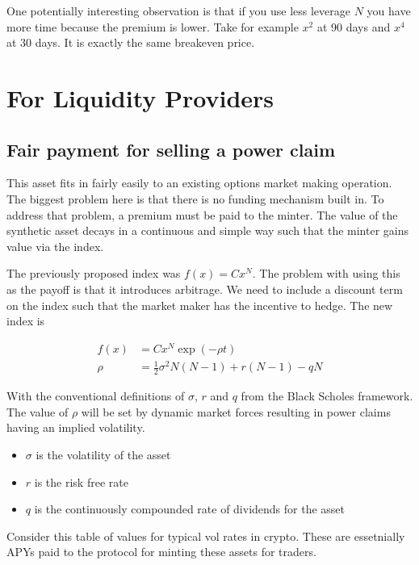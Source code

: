 \documentclass[12pt]{article}
\newcommand{\half}{\tfrac{1}{2}}
\begin{document}
    One potentially interesting observation is that if you use less leverage $N$ you have more time because the premium is lower. Take for example $x^2$ at 90 days and $x^4$ at 30 days. It is exactly the same breakeven price.

    \section{For Liquidity Providers}

    \subsection{Fair payment for selling a power claim}

    This asset fits in fairly easily to an existing options market making operation. The biggest problem here is that there is no funding mechanism built in. To address that problem, a premium must be paid to the minter. The value of the synthetic asset decays in a continuous and simple way such that the minter gains value via the index.

    The previously proposed index was $f(x) = C x^N$. The problem with using this as the payoff is that it introduces arbitrage. We need to include a discount term on the index such that the market maker has the incentive to hedge. The new index is

    \begin{align*}
        f(x) &= C x^N \exp(-\rho t)\\
        \rho &= \half \sigma^2 N (N-1) + r (N-1) - q N
    \end{align*}

    With the conventional definitions of $\sigma$, $r$ and $q$ from the Black Scholes framework. The value of $\rho$ will be set by dynamic market forces resulting in power claims having an implied volatility.

    \begin{itemize}
        \item $\sigma$ is the volatility of the asset
        \item $r$ is the risk free rate
        \item $q$ is the continuously compounded rate of dividends for the asset
    \end{itemize}

    Consider this table of values for typical vol rates in crypto. These are essetnially APYs paid to the protocol for minting these assets for traders.
\end{document}
